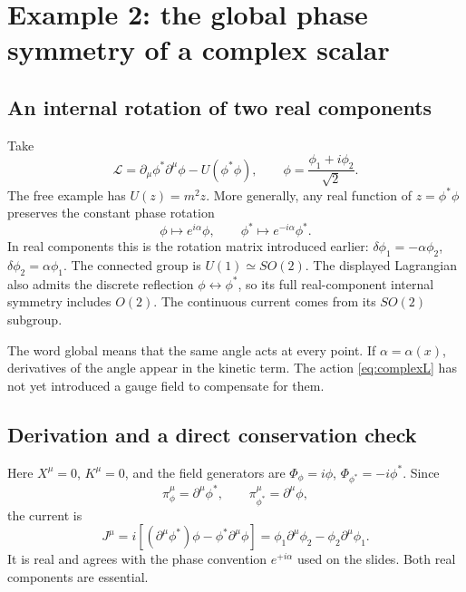 \documentclass[11pt]{article}
\newcommand{\Lag}{\mathcal{L}}
\begin{document}
\section{Example 2: the global phase symmetry of a complex scalar}

\subsection{An internal rotation of two real components}
Take
\begin{equation}
\Lag=\partial_\mu\phi^*\partial^\mu\phi-U(\phi^*\phi),
\qquad \phi=\frac{\phi_1+i\phi_2}{\sqrt2}.
\label{eq:complexL}
\end{equation}
The free example has \(U(z)=m^2z\). More generally, any real function of
\(z=\phi^*\phi\) preserves the constant phase rotation
\begin{equation}
\phi\longmapsto e^{i\alpha}\phi,\qquad
\phi^*\longmapsto e^{-i\alpha}\phi^*.
\end{equation}
In real components this is the rotation matrix introduced earlier:
\(\delta\phi_1=-\alpha\phi_2\), \(\delta\phi_2=\alpha\phi_1\).
The connected group is \(U(1)\simeq SO(2)\).
The displayed Lagrangian also admits the discrete reflection
\(\phi\leftrightarrow\phi^*\), so its full real-component internal
symmetry includes \(O(2)\). The continuous current comes from its
\(SO(2)\) subgroup.

The word global means that the same angle acts at every point. If
\(\alpha=\alpha(x)\), derivatives of the angle appear in the kinetic
term. The action \eqref{eq:complexL} has not yet introduced a gauge field
to compensate for them.

\subsection{Derivation and a direct conservation check}
Here \(X^\mu=0\), \(K^\mu=0\), and the field generators are
\(\Phi_\phi=i\phi\), \(\Phi_{\phi^*}=-i\phi^*\). Since
\begin{equation}
\pi_\phi^\mu=\partial^\mu\phi^*,\qquad
\pi_{\phi^*}^\mu=\partial^\mu\phi,
\end{equation}
the current is
\begin{equation}
\boxed{J^\mu=i\left[(\partial^\mu\phi^*)\phi
-\phi^*\partial^\mu\phi\right]
=\phi_1\partial^\mu\phi_2-\phi_2\partial^\mu\phi_1.}
\label{eq:U1}
\end{equation}
It is real and agrees with the phase convention \(e^{+i\alpha}\) used
on the slides. Both real components are essential.
\end{document}
